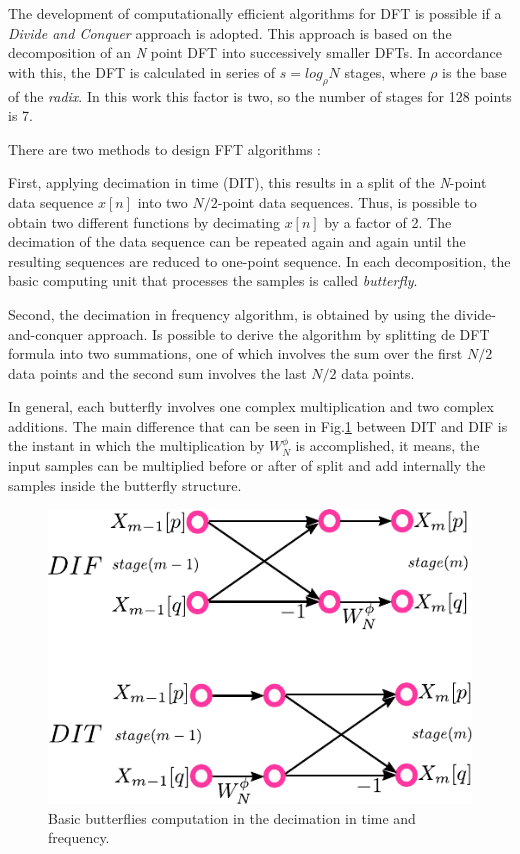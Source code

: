 \documentclass[journal,comsoc]{IEEEtran}
\begin{document}
The development of computationally efficient algorithms for DFT is possible if a \textit{Divide and Conquer} approach is adopted. This approach is based on the decomposition of an \textit{N} point DFT into successively smaller DFTs. In accordance with this, the DFT is calculated in series of $s=log_\rho N$ stages, where $\rho$ is the base of the \textit{radix}. In this work this factor is two, so the number of stages for 128 points is 7.

There are two methods to design FFT algorithms \cite{proakis_digital_nodate,oppenheim_tratamiento_2011}: 

First, applying decimation in time (DIT), this results in a split of the \textit{N}-point data sequence $x[n]$ into two $N/2$-point data sequences. Thus, is possible to obtain two different functions by decimating $x[n]$ by a factor of 2. The decimation of the data sequence can be repeated again and again until the resulting sequences are reduced to one-point sequence. In each decomposition, the basic computing unit that processes the samples is called \textit{butterfly}.

Second, the decimation in frequency algorithm, is obtained by using the divide-and-conquer approach. Is possible to derive the algorithm by splitting de DFT formula into two summations, one of which involves the sum over the first $N/2$ data points and the second sum involves the last $N/2$ data points.

In general, each butterfly involves one complex multiplication and two complex additions. The main difference that can be seen in Fig.\ref{fig:difdit} between DIT and DIF is the instant in which the multiplication by $W_N^\phi$ is accomplished, it means, the input samples can be multiplied before or after of split and add internally the samples inside the butterfly structure.

\begin{figure} 
	\centering
	\includegraphics[width=0.65\linewidth]{Diagramas/miSeccionFiguras/DifDit.pdf}
	\caption{Basic butterflies computation in the decimation in time and frequency.}
	\label{fig:difdit}
\end{figure}
\end{document}
